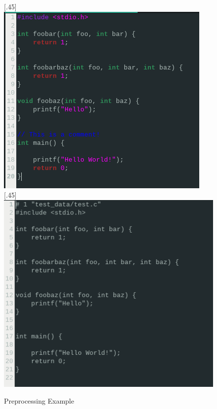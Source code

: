 \documentclass{article}
\begin{document}
\begin{figure}[ht]
    [.45\linewidth]{%
        \includegraphics[width=\linewidth]{im1.png}%
      }%
      \hfill
      [.45\linewidth]{%
        \includegraphics[width=\linewidth]{im2.png}%
      }
      \caption{Preprocessing Example}
      \label{fig:preprocess_example}
\end{figure}
\end{document}
